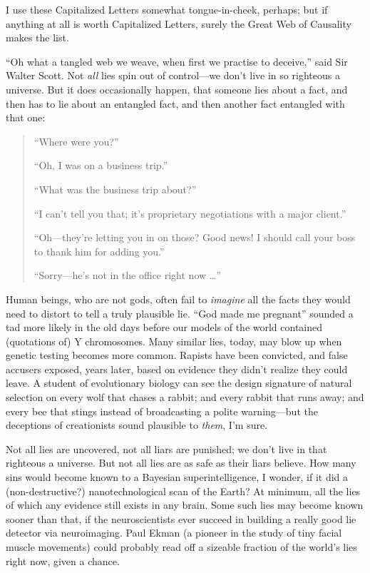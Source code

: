 {
 I use these Capitalized Letters somewhat tongue-in-cheek, perhaps;
but if anything at all is worth Capitalized Letters, surely the Great
Web of Causality makes the list.}

{
 ``Oh what a tangled web we weave, when first we
practise to deceive,'' said Sir Walter Scott. Not
\textit{all} lies spin out of control---we don't live
in so righteous a universe. But it does occasionally happen, that
someone lies about a fact, and then has to lie about an entangled fact,
and then another fact entangled with that one:}

\begin{quote}
{
 ``Where were you?''}

{
 ``Oh, I was on a business
trip.''}

{
 ``What was the business trip
about?''}

{
 ``I can't tell you that;
it's proprietary negotiations with a major
client.''}

{
 ``Oh---they're letting you in on
those? Good news! I should call your boss to thank him for adding
you.''}

{
 ``Sorry---he's not in the office
  right now \ldots''}
\end{quote}

{
 Human beings, who are not gods, often fail to \textit{imagine} all
the facts they would need to distort to tell a truly plausible lie.
``God made me pregnant'' sounded a
tad more likely in the old days before our models of the world
contained (quotations of) Y chromosomes. Many similar lies, today, may
blow up when genetic testing becomes more common. Rapists have been
convicted, and false accusers exposed, years later, based on evidence
they didn't realize they could leave. A student of
evolutionary biology can see the design signature of natural selection
on every wolf that chases a rabbit; and every rabbit that runs away;
and every bee that stings instead of broadcasting a polite
warning---but the deceptions of creationists sound plausible to
\textit{them}, I'm sure.}

{
 Not all lies are uncovered, not all liars are punished; we
don't live in that righteous a universe. But not all
lies are as safe as their liars believe. How many sins would become
known to a Bayesian superintelligence, I wonder, if it did a
(non-destructive?) nanotechnological scan of the Earth? At minimum, all
the lies of which any evidence still exists in any brain. Some such
lies may become known sooner than that, if the neuroscientists ever
succeed in building a really good lie detector via neuroimaging. Paul
Ekman (a pioneer in the study of tiny facial muscle movements) could
probably read off a sizeable fraction of the world's
lies right now, given a chance.}

